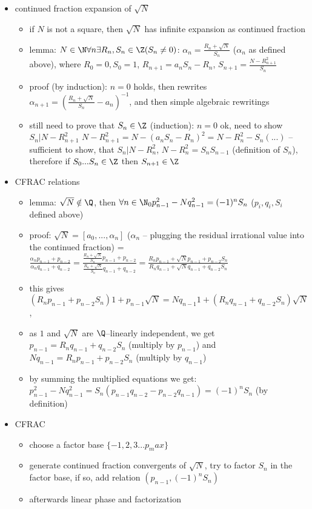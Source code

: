 \begin{itemize}
	\item continued fraction expansion of $\sqrt{N}$
	\begin{itemize}
		\item if $N$ is not a square, then $\sqrt{N}$ has infinite expansion as continued fraction
		\item lemma: $N\in\N \forall n \exists R_n, S_n \in \Z (S_n \neq 0)$: $\alpha_n = \frac{R_n +\sqrt{N}}{S_n}$ ($\alpha_n$ as defined above), where $R_0 = 0, S_0 = 1$, $R_{n+1} = a_nS_n-R_n$, $S_{n+1} = \frac{N - R^2_{n+1}}{S_n}$
		\item proof (by induction): $n=0$ holds, then rewrites $\alpha_{n+1} = (\frac{R_n+\sqrt{N}}{S_n} -a_n)^{-1}$, and then simple algebraic rewritings
		\item still need to prove that $S_n \in \Z$ (induction): $n=0$ ok, need to show $S_n | N -R_{n+1}^2$ $N-R_{n+1}^2 = N-(a_nS_n-R_n)^2 = N-R_n^2 - S_n(...)$ -- sufficient to show, that $S_n | N -R_{n}^2$, $N-R_n^2 = S_nS_{n-1}$ (definition of $S_n$), therefore if $S_0...S_n\in\Z$ then $S_{n+1}\in\Z$
	\end{itemize}
	
	\item CFRAC relations
	\begin{itemize}
		\item lemma: $\sqrt{N} \notin \Q$, then $\forall n\in\N_0 p^2_{n-1}-Nq^2_{n-1}=(-1)^nS_n$ ($p_i,q_i,S_i$ defined above)
		\item proof: $\sqrt{N} = [a_0,...,\alpha_n]$ ($\alpha_n$ -- plugging the residual irrational value into the continued fraction) = $\frac{\alpha_n p_{n-1} + p_{n-2}}{\alpha_n q_{n-1} + q_{n-2}} = \frac{\frac{R_n+\sqrt{N}}{S_n}p_{n-1} + p_{n-2}}{\frac{R_n+\sqrt{N}}{S_n}q_{n-1} + q_{n-2}} = \frac{R_n p_{n-1}+\sqrt{N}p_{n-1} + p_{n-2}S_n}{R_n q_{n-1}+\sqrt{N}q_{n-1} + q_{n-2}S_n}$
		\item this gives $(R_n p_{n-1} + p_{n-2}S_n)1+p_{n-1}\sqrt{N} = Nq_{n-1}1+(R_n q_{n-1}+q_{n-2}S_n)\sqrt{N}$, 
		\item as $1$ and $\sqrt{N}$ are $\Q$--linearly independent, we get $p_{n-1} = R_{n}q_{n-1}+q_{n-2}S_n$ (multiply by $p_{n-1}$) and $Nq_{n-1} = R_{n}p_{n-1}+p_{n-2}S_n$ (multiply by $q_{n-1}$)
		\item by summing the multiplied equations we get: $p^2_{n-1}-Nq^2_{n-1} = S_{n}(p_{n-1}q_{n-2}-p_{n-2}q_{n-1}) = (-1)^nS_n$ (by definition)
	\end{itemize}
	\item CFRAC
	\begin{itemize}
		\item choose a factor base $\{-1,2,3...p_max\}$
		\item generate continued fraction convergents of $\sqrt{N}$, try to factor $S_n$ in the factor base, if so, add relation $(p_{n-1}, (-1)^nS_n)$
		\item afterwards linear phase and factorization
	\end{itemize}
	

\end{itemize}
